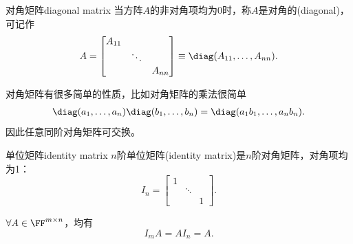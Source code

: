 \begin{definition}
	{对角矩阵}{diagonal matrix}
	当方阵$A$的非对角项均为0时，称$A$是对角的(diagonal)，可记作
	\begin{equation}
		A=\begin{bmatrix}
			A_{11}\\ &\ddots\\ &&A_{nn}
		\end{bmatrix}\equiv\diag(A_{11},\ldots,A_{nn}).
	\end{equation}
\end{definition}

\begin{remark}
	对角矩阵有很多简单的性质，比如对角矩阵的乘法很简单
	\begin{align}
		\diag(a_1,\ldots,a_n)\diag(b_1,\ldots,b_n)=\diag(a_1b_1,\ldots,a_nb_n).
	\end{align}
	因此任意同阶对角矩阵可交换。
\end{remark}

\begin{definition}{单位矩阵}{identity matrix}
	$n$阶单位矩阵(identity matrix)是$n$阶对角矩阵，对角项均为1：
	\[
		I_n=\begin{bmatrix}
		1&\\ &\ddots\\&&1
		\end{bmatrix}.
	\]
\end{definition}

\begin{corollary}
	$\forall A\in\FF^{m\times n}$，均有
	\[
		I_mA=AI_n=A.
	\]
\end{corollary}

